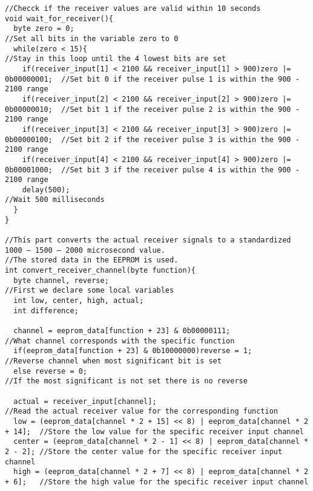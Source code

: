 \begin{lstlisting}
//Checck if the receiver values are valid within 10 seconds
void wait_for_receiver(){
  byte zero = 0;                                                                //Set all bits in the variable zero to 0
  while(zero < 15){                                                             //Stay in this loop until the 4 lowest bits are set
    if(receiver_input[1] < 2100 && receiver_input[1] > 900)zero |= 0b00000001;  //Set bit 0 if the receiver pulse 1 is within the 900 - 2100 range
    if(receiver_input[2] < 2100 && receiver_input[2] > 900)zero |= 0b00000010;  //Set bit 1 if the receiver pulse 2 is within the 900 - 2100 range
    if(receiver_input[3] < 2100 && receiver_input[3] > 900)zero |= 0b00000100;  //Set bit 2 if the receiver pulse 3 is within the 900 - 2100 range
    if(receiver_input[4] < 2100 && receiver_input[4] > 900)zero |= 0b00001000;  //Set bit 3 if the receiver pulse 4 is within the 900 - 2100 range
    delay(500);                                                                 //Wait 500 milliseconds
  }
}

//This part converts the actual receiver signals to a standardized 1000 – 1500 – 2000 microsecond value.
//The stored data in the EEPROM is used.
int convert_receiver_channel(byte function){
  byte channel, reverse;                                                       //First we declare some local variables
  int low, center, high, actual;
  int difference;
  
  channel = eeprom_data[function + 23] & 0b00000111;                           //What channel corresponds with the specific function
  if(eeprom_data[function + 23] & 0b10000000)reverse = 1;                      //Reverse channel when most significant bit is set
  else reverse = 0;                                                            //If the most significant is not set there is no reverse
  
  actual = receiver_input[channel];                                            //Read the actual receiver value for the corresponding function
  low = (eeprom_data[channel * 2 + 15] << 8) | eeprom_data[channel * 2 + 14];  //Store the low value for the specific receiver input channel
  center = (eeprom_data[channel * 2 - 1] << 8) | eeprom_data[channel * 2 - 2]; //Store the center value for the specific receiver input channel
  high = (eeprom_data[channel * 2 + 7] << 8) | eeprom_data[channel * 2 + 6];   //Store the high value for the specific receiver input channel
  

\end{lstlisting}
